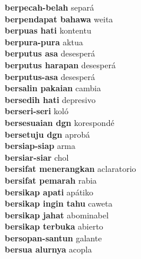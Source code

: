 \textbf{ berpecah-belah  } separá \\
\textbf{ berpendapat bahawa  } weita \\
\textbf{ berpuas hati  } kontentu \\
\textbf{ berpura-pura  } aktua \\
\textbf{ berputus asa  } desesperá \\
\textbf{ berputus harapan  } desesperá \\
\textbf{ berputus-asa  } desesperá \\
\textbf{ bersalin pakaian  } cambia \\
\textbf{ bersedih hati  } depresivo \\
\textbf{ berseri-seri  } koló \\
\textbf{ bersesuaian dgn  } korespondé \\
\textbf{ bersetuju dgn  } aprobá \\
\textbf{ bersiap-siap  } arma \\
\textbf{ bersiar-siar  } chol \\
\textbf{ bersifat menerangkan  } aclaratorio \\
\textbf{ bersifat pemarah  } rabia \\
\textbf{ bersikap apati  } apátiko \\
\textbf{ bersikap ingin tahu  } caweta \\
\textbf{ bersikap jahat  } abominabel \\
\textbf{ bersikap terbuka  } abierto \\
\textbf{ bersopan-santun  } galante \\
\textbf{ bersua alurnya  } acopla \\
